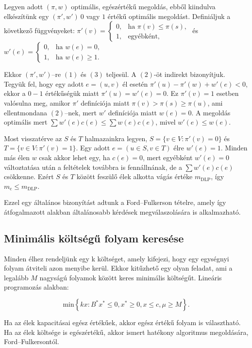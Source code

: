 Legyen adott $(\pi,w)$ optimális, egészértékű megoldás, ebből kiindulva
elkészítünk egy $(\pi',w')~0$ vagy $1$ értékű optimális megoldást. Definiáljuk a
következő függvényeket:
$\pi'(v)=
\begin{cases}
0, &\mbox{ha } \pi(v) \leq \pi(s), \\
1, &\mbox{egyébként},
\end{cases}$ és
$w'(e)=
\begin{cases}
0, &\mbox{ha } w(e)=0, \\
1, &\mbox{ha } w(e) \geq 1.
\end{cases}$

Ekkor $(\pi',w')$--re $(1)$ és $(3)$ teljesül. A $(2)$-öt indirekt bizonyítjuk.
Tegyük fel, hogy egy adott $e=(u,v)$ él esetén $\pi'(u)-\pi'(w)+w'(e)<0$, ekkor
a $0-1$ értékűségük miatt $\pi'(u)=w'(e)=0$. Ez $\pi'(v)=1$ esetben valósulna
meg, amikor $\pi'$ definíciója miatt $\pi(v) > \pi(s) \geq \pi(u)$, ami
ellentmondana $(2)$--nek, mert $w'$ definíciója miatt $w(e)=0$. A megoldás
optimális mert $\sum w'(e)c(e) \leq \sum w(e)c(e)$, mivel $w'(e) \leq w(e)$.

Most visszatérve az $S$ és $T$ halmazainkra legyen, $S=\{v \in V: \pi'(v)=0\} $
és $T=\{v \in V: \pi'(v)=1\}$. Egy adott $e=(u \in S, v \in T)$ élre $w'(e)=1$.
Minden más élen $w$ csak akkor lehet egy, ha $c(e)=0$, mert egyébként $w'(e)=0$
változtatása után a feltételek továbbra is fennállnának, de a $\sum w'(e)c(e)$
csökkenne. Ezért $S$ és $T$ között feszülő élek alkotta vágás értéke
$m_{\mbox{DLP}}$, így $m_{\mbox{c}} \leq m_{\mbox{DLP}}$.

Ezzel egy általános bizonyítást adtunk a Ford--Fulkerson tételre, amely így
átfogalmazott alakban általánosabb kérdések megválaszolására is alkalmazható.

\subsection{Minimális költségű folyam keresése}

Minden élhez rendeljünk egy k költséget, amely kifejezi, hogy egy egységnyi folyam
átviteli azon menyibe kerül. Ekkor kitűzhető egy olyan feladat, ami a legalább $M$
nagyságú folyamok között keres minimális költségűt. Lineáris programozás alakban:

\[ \mbox{min} \left\{kx: B^*x^* \leq 0, x^* \geq 0, x \leq c,\mu \geq M \right\}. \]

Ha az élek kapacitásai egész értékűek, akkor egész értékű folyam is választható.
Ha az élek költsége is egészértékű, akkor ismert hatékony algoritmus megoldására,
Ford--Fulkersontól.

